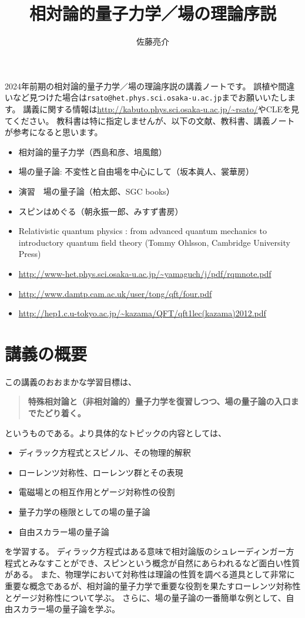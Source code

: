 \documentclass[10pt,a4paper]{jarticle}
\author{佐藤亮介}
\title{相対論的量子力学／場の理論序説}
\begin{document}
\maketitle

2024年前期の相対論的量子力学／場の理論序説の講義ノートです。
誤植や間違いなど見つけた場合は\texttt{rsato@het.phys.sci.osaka-u.ac.jp}までお願いいたします。
講義に関する情報は\url{http://kabuto.phys.sci.osaka-u.ac.jp/~rsato/}やCLEを見てください。
教科書は特に指定しませんが、以下の文献、教科書、講義ノートが参考になると思います。
\begin{itemize}
\item 相対論的量子力学（西島和彦、培風館）
\item 場の量子論: 不変性と自由場を中心にして（坂本眞人、裳華房）
\item 演習　場の量子論（柏太郎、SGC books）
\item スピンはめぐる（朝永振一郎、みすず書房）
\item Relativistic quantum physics : from advanced quantum mechanics to introductory quantum field theory (Tommy Ohlsson, Cambridge University Press)
\item \url{http://www-het.phys.sci.osaka-u.ac.jp/~yamaguch/j/pdf/rqmnote.pdf}
\item \url{http://www.damtp.cam.ac.uk/user/tong/qft/four.pdf}
\item \url{http://hep1.c.u-tokyo.ac.jp/~kazama/QFT/qft1lec(kazama)2012.pdf}
\end{itemize}


\tableofcontents
\setcounter{section}{-1}
\section{講義の概要}
この講義のおおまかな学習目標は、
\begin{quote}
\textbf{特殊相対論と（非相対論的）量子力学を復習しつつ、場の量子論の入口までたどり着く。}
\end{quote}
というものである。より具体的なトピックの内容としては、
\begin{itemize}
\item ディラック方程式とスピノル、その物理的解釈
\item ローレンツ対称性、ローレンツ群とその表現
\item 電磁場との相互作用とゲージ対称性の役割
\item 量子力学の極限としての場の量子論
\item 自由スカラー場の量子論
\end{itemize}
を学習する。
ディラック方程式はある意味で相対論版のシュレーディンガー方程式とみなすことができ、スピンという概念が自然にあらわれるなど面白い性質がある。
また、物理学において対称性は理論の性質を調べる道具として非常に重要な概念であるが、相対論的量子力学で重要な役割を果たすローレンツ対称性とゲージ対称性について学ぶ。
さらに、場の量子論の一番簡単な例として、自由スカラー場の量子論を学ぶ。
\end{document}
